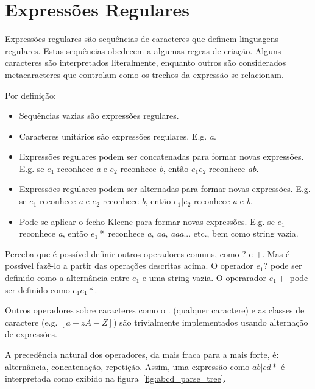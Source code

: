 \documentclass[a4paper,12pt,oneside,onecolumn]{uerj}
\begin{document}
\section{Expressões Regulares}

Expressões regulares são sequências de caracteres que definem linguagens regulares. Estas sequências obedecem a algumas regras de criação. Alguns caracteres são interpretados literalmente, enquanto outros são considerados metacaracteres que controlam como os trechos da expressão se relacionam.

Por definição:

\begin{itemize}
    \item Sequências vazias são expressões regulares.
    \item Caracteres unitários são expressões regulares. E.g. \emph{a}.
    \item Expressões regulares podem ser concatenadas para formar novas expressões. E.g. se $e_1$ reconhece \emph{a} e $e_2$ reconhece \emph{b}, então $e_1e_2$ reconhece \emph{ab}.
    \item Expressões regulares podem ser alternadas para formar novas expressões. E.g. se $e_1$ reconhece \emph{a} e $e_2$ reconhece \emph{b}, então $e_1|e_2$ reconhece \emph{a} e \emph{b}.
    \item Pode-se aplicar o fecho Kleene para formar novas expressões. E.g. se $e_1$ reconhece \emph{a}, então $e_1*$ reconhece \emph{a}, \emph{aa}, \emph{aaa}... etc., bem como string vazia.
\end{itemize}

Perceba que é possível definir outros operadores comuns, como $?$ e $+$. Mas é possível fazê-lo a partir das operações descritas acima. O operador $e_1?$ pode ser definido como a alternância entre $e_1$ e uma string vazia. O operarador $e_1+$ pode ser definido como $e_1e_1*$.

Outros operadores sobre caracteres como o $.$ (qualquer caractere) e as classes de caractere (e.g. $[a-zA-Z]$) são trivialmente implementados usando alternação de expressões.

A precedência natural dos operadores, da mais fraca para a mais forte, é: alternância, concatenação, repetição. Assim, uma expressão como $ab|cd*$ é interpretada como exibido na figura~\ref{fig:abcd_parse_tree}.
\end{document}
